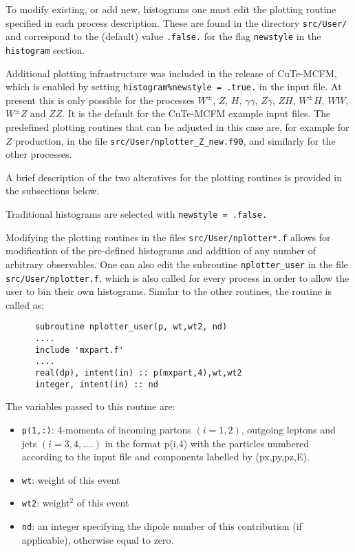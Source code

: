 To modify existing, or add new, histograms one must edit the plotting
routine specified in each process description.  These are found in
the directory {\tt src/User/} and correspond to the (default) value
{\tt .false.} for the flag {\tt newstyle} in the {\tt histogram} section.

Additional plotting infrastructure was included in the release
of CuTe-MCFM, which is enabled by setting {\tt histogram\%newstyle = .true.}
in the input file.
At present this is only possible for the processes
$W^\pm$, $Z$, $H$, $\gamma\gamma$, $Z\gamma$, $ZH$,
$W^\pm H$, $WW$, $W^\pm Z$ and $ZZ$.
It is the default for the CuTe-MCFM example input files.
The predefined plotting routines that can be adjusted in this case are,
for example for $Z$ production, in the file
{\tt src/User/nplotter\_Z\_new.f90}, and similarly for the other processes.

A brief description of the two alteratives for the plotting routines is
provided in the  subsections below.

\label{sec:oldhistos}
Traditional histograms are selected with {\tt newstyle = .false.}


Modifying the plotting routines in the files \texttt{src/User/nplotter*.f} allows for modification of the pre-defined 
histograms and addition of any number of arbitrary observables. 
One can also edit the subroutine {\tt nplotter\_user} in the file \texttt{src/User/nplotter.f},
which is also called for every
process in order to allow the user to bin their own histograms. 
Similar to the other routines, the routine is called as:
\begin{verbatim}
      subroutine nplotter_user(p, wt,wt2, nd)
      ....
      include 'mxpart.f'
      ....
      real(dp), intent(in) :: p(mxpart,4),wt,wt2
      integer, intent(in) :: nd
\end{verbatim}
The variables passed to this routine are:
\label{user}
\begin{itemize}
\item {\tt p(1,:)}:  4-momenta of incoming partons $(i=1,2)$, outgoing leptons and jets $(i=3,4,....)$ in the format p(i,4) with the particles 
numbered according to the input file and components labelled by (px,py,pz,E).  
\item  {\tt wt}:  weight of this event
\item  {\tt wt2}:  weight$^2$ of this event
\item  {\tt nd}:  an integer specifying the dipole number of this contribution (if applicable), otherwise equal to zero.
\end{itemize}

